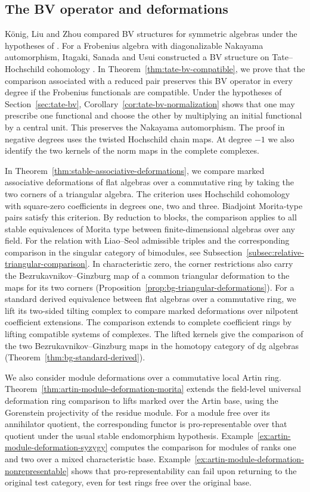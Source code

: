 \documentclass[12pt,a4paper,english,reqno]{amsart}
\numberwithin{equation}{section}
\theoremstyle{plain}
\theoremstyle{definition}
\begin{document}
\subsection{The BV operator and deformations}

K\"onig, Liu and Zhou compared BV structures for symmetric algebras
under the hypotheses of \cite[Theorem~10.7]{KoenigLiuZhou2012}.
For a Frobenius algebra with diagonalizable Nakayama automorphism,
Itagaki, Sanada and Usui constructed a BV structure on
Tate--Hochschild cohomology \cite{ISUTateBV}.
In Theorem~\ref{thm:tate-bv-compatible}, we prove that the comparison
associated with a reduced pair preserves this BV operator in every
degree if the Frobenius functionals are compatible. Under the
hypotheses of Section~\ref{sec:tate-bv},
Corollary~\ref{cor:tate-bv-normalization} shows that one may prescribe
one functional and choose the other by multiplying an initial
functional by a central unit. This preserves the Nakayama
automorphism. The proof in negative degrees uses the twisted
Hochschild chain maps. At degree $-1$ we also identify the two
kernels of the norm maps in the complete complexes.

In Theorem~\ref{thm:stable-associative-deformations}, we compare
marked associative deformations of flat algebras over a commutative
ring by taking the two corners of a triangular algebra. The
criterion uses Hochschild cohomology with square-zero coefficients
in degrees one, two and three. Biadjoint Morita-type pairs satisfy
this criterion. By reduction to blocks, the comparison applies to
all stable equivalences of Morita type between finite-dimensional
algebras over any field. For the relation with Liao--Seol admissible
triples and the corresponding comparison in the singular category
of bimodules, see Subsection~\ref{subsec:relative-triangular-comparison}.
In characteristic zero, the corner restrictions also carry the
Bezrukavnikov--Ginzburg map of a common triangular deformation
to the maps for its two corners
(Proposition~\ref{prop:bg-triangular-deformations}).
For a standard derived equivalence between flat algebras over a
commutative ring, we lift its two-sided tilting complex to compare
marked deformations over nilpotent coefficient extensions.
The comparison extends to complete coefficient rings by lifting
compatible systems of complexes.
The lifted kernels give the comparison of the two
Bezrukavnikov--Ginzburg maps in the homotopy category of dg algebras
(Theorem~\ref{thm:bg-standard-derived}).

We also consider module deformations over a commutative local
Artin ring. Theorem~\ref{thm:artin-module-deformation-morita}
extends the field-level universal deformation ring comparison to
lifts marked over the Artin base, using the Gorenstein projectivity
of the residue module. For a module free over its annihilator
quotient, the corresponding functor is pro-representable over
that quotient under the usual stable endomorphism hypothesis.
Example~\ref{ex:artin-module-deformation-syzygy} computes the
comparison for modules of ranks one and two over a mixed
characteristic base.
Example~\ref{ex:artin-module-deformation-nonrepresentable} shows
that pro-representability can fail upon returning to the original
test category, even for test rings free over the original base.
\end{document}
